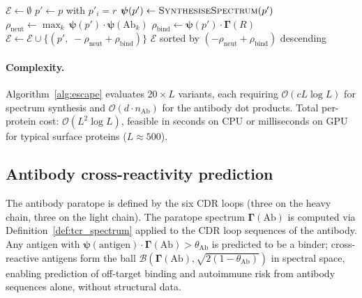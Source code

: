 \documentclass[twocolumn,11pt,a4paper]{article}
\theoremstyle{definition}
\theoremstyle{remark}
\begin{document}
\begin{algorithm}
\caption{Immune escape variant enumeration}
\label{alg:escape}
\begin{algorithmic}[1]
\State $\mathcal{E} \gets \emptyset$
  \State $p' \gets p$ with $p'_i = r$
    \hfill{}
  \State $\bm{\psi}(p') \gets \textsc{SynthesiseSpectrum}(p')$
    \hfill{}
  \State $\rho_{\mathrm{neut}} \gets \max_k\,
    \bm{\psi}(p')\cdot\bm{\psi}(\mathrm{Ab}_k)$
  \State $\rho_{\mathrm{bind}} \gets \bm{\psi}(p')\cdot\bm{\Gamma}(R)$
    \State $\mathcal{E} \gets \mathcal{E} \cup
      \{(p',\; -\rho_{\mathrm{neut}} + \rho_{\mathrm{bind}})\}$
  \EndIf
\EndFor
\State \Return $\mathcal{E}$ sorted by
  $(-\rho_{\mathrm{neut}} + \rho_{\mathrm{bind}})$ descending
\end{algorithmic}
\end{algorithm}

\paragraph{Complexity.}
Algorithm~\ref{alg:escape} evaluates $20 \times L$ variants, each requiring
$\mathcal{O}(cL\log L)$ for spectrum synthesis and $\mathcal{O}(d\cdot
n_{\mathrm{Ab}})$ for the antibody dot products. Total per-protein cost:
$\mathcal{O}(L^2\log L)$, feasible in seconds on CPU or milliseconds on GPU
for typical surface proteins ($L \approx 500$).

\subsection{Antibody cross-reactivity prediction}
\label{sec:ab_cross_reactivity}

The antibody paratope is defined by the six CDR loops (three on the heavy
chain, three on the light chain). The paratope spectrum
$\bm{\Gamma}(\mathrm{Ab})$ is computed via Definition~\ref{def:tcr_spectrum}
applied to the CDR loop sequences of the antibody. Any antigen with
$\bm{\psi}(\mathrm{antigen})\cdot\bm{\Gamma}(\mathrm{Ab}) > \theta_{\mathrm{Ab}}$
is predicted to be a binder; cross-reactive antigens form the ball
$\mathcal{B}(\bm{\Gamma}(\mathrm{Ab}), \sqrt{2(1-\theta_{\mathrm{Ab}})})$
in spectral space, enabling prediction of off-target binding and autoimmune
risk from antibody sequences alone, without structural data.
\end{document}
